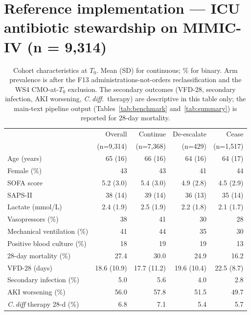 \documentclass[11pt,a4paper]{article}
\begin{document}
\section{Reference implementation --- ICU antibiotic stewardship on MIMIC-IV (n = 9{,}314)}\label{sec:reference}

\begin{table}[H]
  \centering
  \small
  \caption{Cohort characteristics at $T_0$. Mean (SD) for continuous; \% for binary. Arm prevalence is after the F13 administrations-not-orders reclassification and the WS4 CMO-at-$T_0$ exclusion. The secondary outcomes (VFD-28, secondary infection, AKI worsening, \emph{C.\,diff.}\ therapy) are descriptive in this table only; the main-text pipeline output (Tables~\ref{tab:benchmark} and~\ref{tab:summary}) is reported for 28-day mortality.}
  \label{tab:cohort}
  \begin{tabular}{lrrrr}
    \toprule
                              & Overall    & Continue   & De-escalate & Cease \\
                              & (n=9{,}314)& (n=7{,}368)& (n=429)     & (n=1{,}517) \\
    \midrule
    Age (years)               & 65 (16)    & 66 (16)    & 64 (16)     & 64 (17) \\
    Female (\%)               & 43         & 43         & 41          & 44 \\
    SOFA score                & 5.2 (3.0)  & 5.4 (3.0)  & 4.9 (2.8)   & 4.5 (2.9) \\
    SAPS-II                   & 38 (14)    & 39 (14)    & 36 (13)     & 35 (14) \\
    Lactate (mmol/L)          & 2.4 (1.9)  & 2.5 (1.9)  & 2.2 (1.8)   & 2.1 (1.7) \\
    Vasopressors (\%)         & 38         & 41         & 30          & 28 \\
    Mechanical ventilation (\%)& 41        & 44         & 35          & 30 \\
    Positive blood culture (\%)& 18        & 19         & 19          & 13 \\
    \midrule
    28-day mortality (\%)     & 27.4       & 30.0       & 24.9        & 16.2 \\
    VFD-28 (days)             & 18.6 (10.9)& 17.7 (11.2)& 19.6 (10.4) & 22.5 (8.7) \\
    Secondary infection (\%)  & 5.0        & 5.6        & 4.0         & 2.8 \\
    AKI worsening (\%)        & 56.0       & 57.8       & 51.5        & 49.7 \\
    \emph{C.\,diff} therapy 28-d (\%) & 6.8 & 7.1        & 5.4         & 5.7 \\
    \bottomrule
  \end{tabular}
\end{table}
\end{document}
